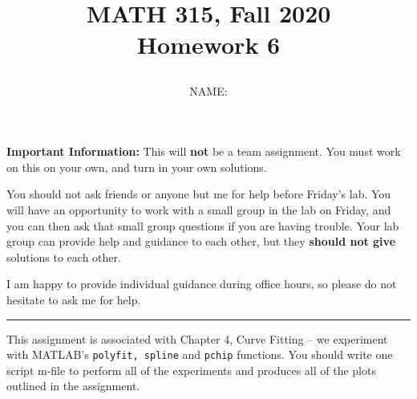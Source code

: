 \documentclass[12pt]{article}
\title{MATH 315, Fall 2020 \\[3pt]
Homework 6
\date{}}
\author{NAME: }
\begin{document}
\maketitle

{\bf Important Information:} This will {\bf not} be a team assignment. You must work on this on your own, and turn in your own solutions.  

You should not ask friends or anyone but me for help before Friday's lab. You will have an opportunity to work with a small group in the lab on Friday, and you can then ask that small group questions if you are having trouble. Your lab group can provide help and guidance to each other, but they {\bf should not give} solutions to each other. 

I am happy to provide individual guidance during office hours, so please do not hesitate to ask me for help.

\begin{center}
\rule[0pt]{12cm}{1pt}
\end{center}


This assignment is associated with Chapter 4, Curve Fitting -- we experiment with MATLAB's {\tt polyfit, spline} and {\tt pchip}
functions.
You should write one script m-file to perform all of the experiments and produces all of the plots outlined in the assignment.

\vspace{12pt}
\end{document}
